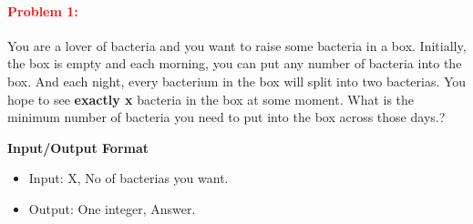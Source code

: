 \documentclass[a4paper,11pt]{article} %
\begin{document}








\paragraph{\textcolor{red}{Problem 1: }}
You are a lover of bacteria and you want to raise some bacteria in a box. Initially, the box is empty and each morning, you can put any number of bacteria into the box. And each night, every bacterium in the box will split into two bacterias. You hope to see \textbf{exactly x} bacteria in the box at some moment.
What is the minimum number of bacteria you need to put into the box across those days.?   \\

\vspace*{0.3cm}

\textbf{Input/Output Format}
\begin{itemize}
    \item  Input: X, No of bacterias you want.
    \item  Output: One integer, Answer.
\end{itemize}
\end{document}
